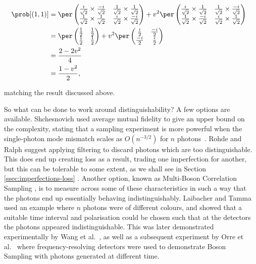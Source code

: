 \begin{align}
\prob[(1,1)] &= \per\begin{pmatrix}\frac{i}{\sqrt{2}}\times\frac{-i}{\sqrt{2}}&\frac{1}{\sqrt{2}}\times\frac{1}{\sqrt{2}}\\\frac{1}{\sqrt{2}}\times\frac{1}{\sqrt{2}}&\frac{i}{\sqrt{2}}\times\frac{-i}{\sqrt{2}}\end{pmatrix} + v^2 \per\begin{pmatrix}\frac{i}{\sqrt{2}}\times\frac{1}{\sqrt{2}}&\frac{1}{\sqrt{2}}\times\frac{-i}{\sqrt{2}}\\\frac{1}{\sqrt{2}}\times\frac{-i}{\sqrt{2}}&\frac{i}{\sqrt{2}}\times\frac{1}{\sqrt{2}}\end{pmatrix}\\
&= \per\begin{pmatrix}\frac{1}{2}&\frac{1}{2}\\\frac{1}{2}&\frac{1}{2}\end{pmatrix} + v^2 \per\begin{pmatrix}\frac{i}{2}&\frac{-i}{2}\\\frac{-i}{2}&\frac{i}{2}\end{pmatrix}\\
&= \frac{2-2v^2}{4}\\
&= \frac{1-v^2}{2},
\end{align}

\noindent matching the result discussed above.

So what can be done to work around distinguishability? A few options are available. Shchesnovich used average mutual fidelity to give an upper bound on the complexity, stating that a sampling experiment is more powerful when the single-photon mode mismatch scales as $O(n^{-3/2})$ for $n$ photons~\cite{shchesnovich2014}. Rohde and Ralph \cite{rohde2012} suggest applying filtering to discard photons which are too distinguishable. This does end up creating loss as a result, trading one imperfection for another, but this can be tolerable to some extent, as we shall see in Section \ref{ssec:imperfections-loss} \cite{rohde2012, aaronson2016}. Another option, known as Multi-Boson Correlation Sampling \cite{tamma2014, tamma2015, laibacher2015, tamma2016, laibacher2017}, is to measure across some of these characteristics in such a way that the photons end up essentially behaving indistinguishably. Laibacher and Tamma used an example where $n$ photons were of different colours, and showed that a suitable time interval and polarisation could be chosen such that at the detectors the photons appeared indistinguishable. This was later demonstrated experimentally by Wang et al.~\cite{wang2018timebin}, as well as a subsequent experiment by Orre et al.~\cite{orre2019} where frequency-resolving detectors were used to demonstrate Boson Sampling with photons generated at different time.

